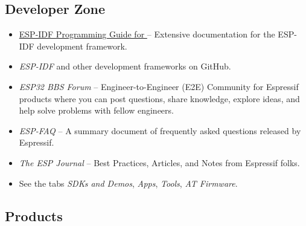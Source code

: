 {\begin{minipage}{\textwidth}
\subsection*{Developer Zone}

\begin{itemize}
  \ifcsname linkidfprogguideEN\endcsname%
    \item \href{\linkprefix\linkidfprogguideEN}{ESP-IDF Programming Guide for \chipseries{}} --
        {\small Extensive documentation for the ESP-IDF development framework.}
  \fi%

    \item \textit{ESP-IDF} and other development frameworks on GitHub.\\
        \href{\linkprefix\linkgithub}{\linkprefix\linkgithub}

    \item \textit{ESP32 BBS Forum} --
        {\small Engineer-to-Engineer (E2E) Community for Espressif products where you can post questions, share knowledge, explore ideas, and help solve problems with fellow engineers.}\\
        \href{\linkprefix\linkespforum}{\linkprefix\linkespforum}

    \item \textit{ESP-FAQ} --
        {\small A summary document of frequently asked questions released by Espressif.}\\
        \href{\linkprefix\linkespfaqEN}{\linkprefix\linkespfaqEN}

    \item \textit{The ESP Journal} --
        {\small Best Practices, Articles, and Notes from Espressif folks.}\\
        \href{\linkprefix\linkespjournal}{\linkprefix\linkespjournal}

    \item See the tabs \textit{SDKs and Demos}, \textit{Apps}, \textit{Tools}, \textit{AT Firmware}.\\
        \href{\linkprefix\linksdkdemoEN}{\linkprefix\linksdkdemoEN}
\end{itemize}

\end{minipage}



\begin{minipage}{\textwidth}

\subsection*{Products}


\end{minipage}}
